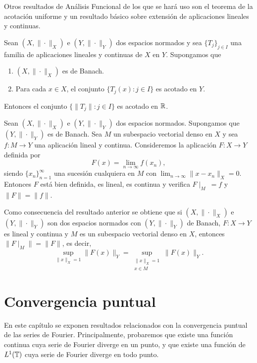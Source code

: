 \documentclass[a4paper, 12pt, oneside]{book}
\begin{document}
Otros resultados de Análisis Funcional de los que se hará uso son el teorema de la acotación uniforme y un resultado básico sobre extensión de aplicaciones lineales y continuas.

\begin{theorem}\label{1.3.1}
    Sean $(X, \|\cdot\|_X)$ e $(Y,\|\cdot\|_Y)$ dos espacios normados y sea $\{T_j\}_{j \in I}$ una familia de aplicaciones lineales y continuas de $X$ en $Y$. Supongamos que
    \begin{enumerate}
        \item $(X,\|\cdot\|_X)$ es de Banach.
        \item Para cada $x \in X$, el conjunto $\{T_j(x) \colon j \in I\}$ es acotado en $Y$.
    \end{enumerate}
    Entonces el conjunto $\{\|T_j\| \colon j \in I\}$ es acotado en $\mathbb R$.
\end{theorem}

\begin{theorem}\label{1.3.2}
    Sean $(X,\|\cdot\|_X)$ e $(Y,\|\cdot\|_Y)$ dos espacios normados. Supongamos que $(Y,\|\cdot\|_Y)$ es de Banach. Sea $M$ un subespacio vectorial denso en $X$ y sea $f \colon M \to Y$ una aplicación lineal y continua. Consideremos la aplicación $F \colon X \to Y$ definida por 
    \[F(x) = \lim_{n\to\infty} f(x_n),\]
    siendo $\{x_n\}_{n=1}^\infty$ una sucesión cualquiera en $M$ con $\lim_{n\to\infty} \|x-x_n\|_X = 0$. Entonces $F$ está bien definida, es lineal, es continua y verifica $F\! \mid_M \ = f$ y $\|F\| = \|f\|$.
\end{theorem}

Como consecuencia del resultado anterior se obtiene que si $(X,\|\cdot\|_X)$ e $(Y,\|\cdot\|_Y)$ son dos espacios normados con $(Y,\|\cdot\|_Y)$ de Banach, $F \colon X \to Y$ es lineal y continua y $M$ es un subespacio vectorial denso en $X$, entonces $\|F\! \mid_M \!\! \| = \|F\|$, es decir,
\begin{equation}\label{1.3.3}
    \sup_{\|x\|_X = 1} \|F(x)\|_Y = \sup_{\substack{\|x\|_X = 1 \\ x \in M}} \|F(x)\|_Y.
\end{equation}

\chapter{Convergencia puntual}

En este capítulo se exponen resultados relacionados con la convergencia puntual de las series de Fourier. Principalmente, probaremos que existe una función continua cuya serie de Fourier diverge en un punto, y que existe una función de $L^1(\mathbb T)$ cuya serie de Fourier diverge en todo punto.
\end{document}
